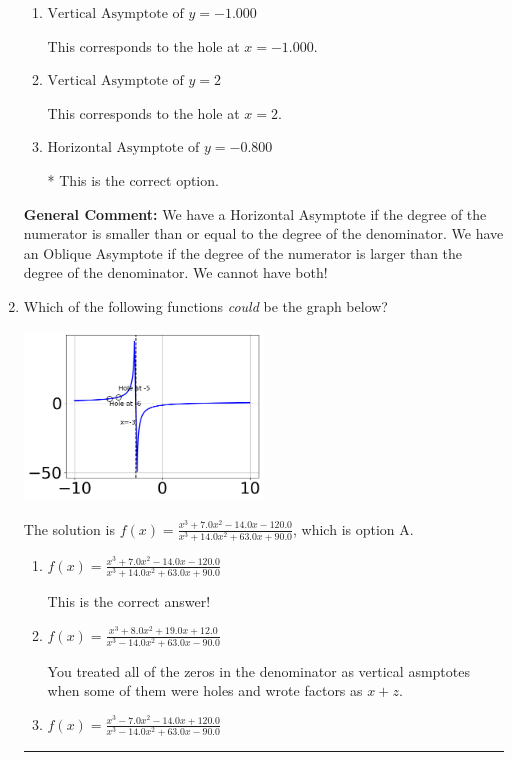 \documentclass{extbook}[14pt]
\newcommand{\litem}[1]{\item #1

\rule{\textwidth}{0.4pt}}
\begin{document}
\begin{enumerate}
{\begin{enumerate}[label=\Alph*.]
This corresponds to using the rule for Horizontal Asymptote when the degree of the denominator is larger than the numerator.
\item \( \text{Vertical Asymptote of } y = -1.000  \)

This corresponds to the hole at $x = -1.000$.
\item \( \text{Vertical Asymptote of } y = 2  \)

This corresponds to the hole at $x = 2$.
\item \( \text{Horizontal Asymptote of } y = -0.800  \)

* This is the correct option.
\end{enumerate}

\textbf{General Comment:} We have a Horizontal Asymptote if the degree of the numerator is smaller than or equal to the degree of the denominator. We have an Oblique Asymptote if the degree of the numerator is larger than the degree of the denominator. We cannot have both!
}
\litem{
Which of the following functions \textit{could} be the graph below?

\begin{center}
    \includegraphics[width=0.5\textwidth]{../Figures/identifyGraphOfRationalFunctionCopyC.png}
\end{center}


The solution is \( f(x)=\frac{x^{3} +7.0 x^{2} -14.0 x -120.0}{x^{3} +14.0 x^{2} +63.0 x + 90.0} \), which is option A.\begin{enumerate}[label=\Alph*.]
\item \( f(x)=\frac{x^{3} +7.0 x^{2} -14.0 x -120.0}{x^{3} +14.0 x^{2} +63.0 x + 90.0} \)

This is the correct answer!
\item \( f(x)=\frac{x^{3} +8.0 x^{2} +19.0 x + 12.0}{x^{3} -14.0 x^{2} +63.0 x -90.0} \)

You treated all of the zeros in the denominator as vertical asmptotes when some of them were holes and wrote factors as $x+z$.
\item \( f(x)=\frac{x^{3} -7.0 x^{2} -14.0 x + 120.0}{x^{3} -14.0 x^{2} +63.0 x -90.0} \)


\end{enumerate}}
\end{enumerate}
\end{document}

